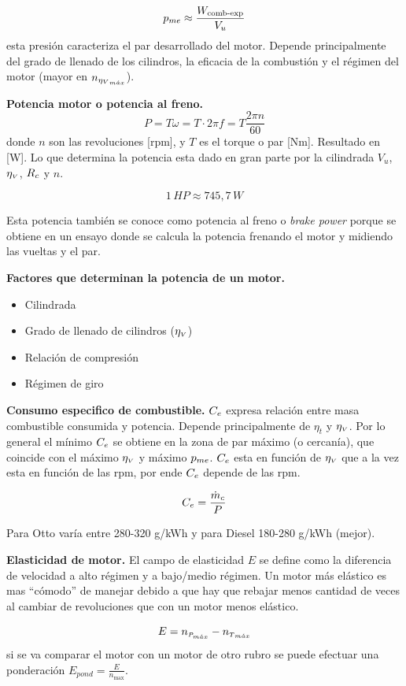 \[
p_{me} \approx \frac{W_{\text{comb-exp}}}{V_u}
\]
esta presión caracteriza el par desarrollado del motor. Depende principalmente del grado de llenado de los cilindros, la eficacia de la combustión y el régimen del motor (mayor en $n_{{\eta_{{\mbox{\tiny$V$}}}}_{{m\acute{a}x}}}$).

\textbf{Potencia motor o potencia al freno.} 
\[
P=T\omega=T \cdot 2 \pi f = T \frac{2\pi n}{60}
\]
donde $n$ son las revoluciones [rpm], y $T$ es el torque o par [Nm]. Resultado en [W]. Lo que determina la potencia esta dado en gran parte por la cilindrada $V_u$, $\eta_{{\mbox{\tiny$V$}}}$, $R_c$ y $n$.

\[
1\, HP \approx 745,7\, W
\]

Esta potencia también se conoce como potencia al freno o \textit{brake power} porque se obtiene en un ensayo donde se calcula la potencia frenando el motor y midiendo las vueltas y el par.

\textbf{Factores que determinan la potencia de un motor.}

\begin{itemize}
    \item Cilindrada
    \item Grado de llenado de cilindros ($\eta_{{\mbox{\tiny$V$}}}$)
    \item Relación de compresión
    \item Régimen de giro
\end{itemize}

\textbf{Consumo especifico de combustible.} $C_e$ expresa relación entre masa combustible consumida y potencia. Depende principalmente de $\eta_t$ y $\eta_{{\mbox{\tiny$V$}}}$. Por lo general el mínimo $C_e$ se obtiene en la zona de par máximo (o cercanía), que coincide con el máximo $\eta_{{\mbox{\tiny$V$}}}$ y máximo $p_{me}$. $C_e$ esta en función de $\eta_{{\mbox{\tiny$V$}}}$ que a la vez esta en función de las rpm, por ende $C_e$ depende de las rpm.

\[
C_e = \frac{\dot{m}_c}{P}
\]

Para Otto varía entre 280-320 g/kWh y para Diesel 180-280 g/kWh (mejor).

\textbf{Elasticidad de motor.} El campo de elasticidad $E$ se define como la diferencia de velocidad a alto régimen y a bajo/medio régimen. Un motor más elástico es mas ``cómodo'' de manejar debido a que hay que rebajar menos cantidad de veces al cambiar de revoluciones que con un motor menos elástico. 

\[
E = n_{{ \mbox{\tiny$P_{m\acute{a}x}$}}}-n_{{ \mbox{\tiny$T$}}_{{m\acute{a}x}}}
\]
si se va comparar el motor con un motor de otro rubro se puede efectuar una ponderación $E_{pond}=\frac{E}{n_{\max}}$.

